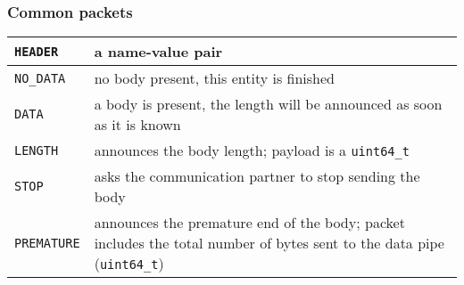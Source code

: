 \documentclass[a4paper,12pt]{article}
\begin{document}
\subsubsection{Common packets}

\begin{longtable}{|l|p{10cm}|}
\hline

\texttt{HEADER} & a name-value pair \\

\hline

\texttt{NO\_DATA} & no body present, this entity is finished \\

\hline

\texttt{DATA} & a body is present, the length will be announced as
soon as it is known \\

\hline

\texttt{LENGTH} & announces the body length; payload is a
\texttt{uint64\_t} \\

\hline

\texttt{STOP} & asks the communication partner to stop sending the
body \\

\hline

\texttt{PREMATURE} & announces the premature end of the body; packet
includes the total number of bytes sent to the data pipe
(\texttt{uint64\_t}) \\

\hline
\end{longtable}
\end{document}
